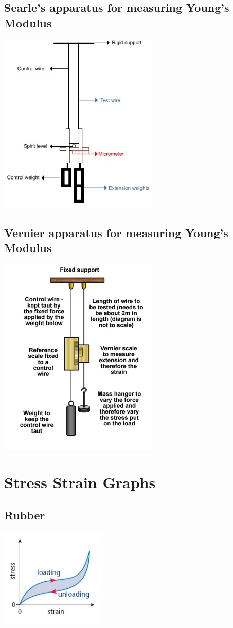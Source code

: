 \documentclass{article}[18pt]
\begin{document}
\subsection{Searle's apparatus for measuring Young's Modulus}
\includegraphics[width=3in]{Searle.jpg}\\
\subsection{Vernier apparatus for measuring Young's Modulus}
\includegraphics[width=3in]{young_modulus.jpg}\\
\newpage
\section{Stress Strain Graphs}
\subsection{Rubber}
\includegraphics[width=2in]{rubber.jpg}\\
\end{document}
